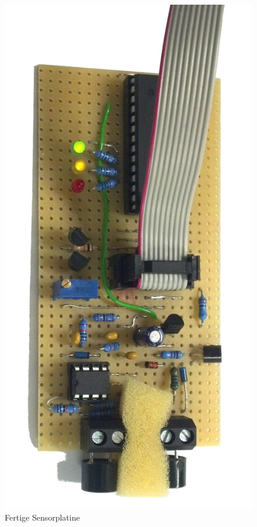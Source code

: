 \begin{figure}[H]
	\centering
	\includegraphics[angle=270, width=(\textwidth)]{fotos/platine_klein2.jpg}
	\caption{Fertige Sensorplatine} \label{img:endplatine_real}
\end{figure}

